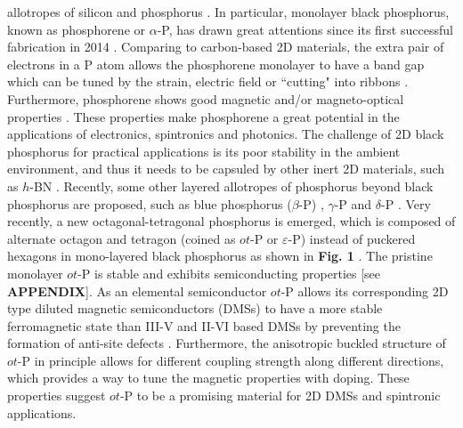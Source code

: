 \documentclass[%
superscriptaddress,
preprint,
showpacs,preprintnumbers,
 amsmath,amssymb,
prb,
]{revtex4-1}
\begin{document}
allotropes of silicon and phosphorus \cite{wang2012electronics, lopez2011boron, Reich2014Nature}. In particular, monolayer black phosphorus, known as phosphorene or $\alpha$-P, has drawn great attentions since its first successful fabrication in 2014 \cite{Li2014NN, Liu2014AN, Koenig2014APL}. Comparing to carbon-based 2D materials, the extra pair of electrons in a P atom allows the phosphorene monolayer to have a band gap which can be tuned by the strain, electric field or ``cutting" into ribbons \cite{Rodin2014PRL, Peng2014PRB, Zhu2014PRL, Zhu2015PRB, Guan2014PRB, Guan2016PRB, Fei2014NL, Fei2015PRB, Tran2014PRB, Tran2014PRB2, Ghosh2016PRB, Wu2015PRB, Gomes2015PRB, Ziletti2015PRB, Elahi2015PRB, Cakir2015PRB, Maity2016PRB, Ma2016PRB, Rivero2015PRB}. Furthermore, phosphorene shows good magnetic and/or magneto-optical properties \cite{Yang2016PRB, Seixas2015PRB, Hanakata2016PRB, Fu2015PRB, Tahir2015PRB, Jiang2015PRB, Pereira2015PRB, Ostahie2016PRB, Zhou2015PRB}. These properties make phosphorene a great potential in the applications of electronics, spintronics and photonics. The challenge of 2D black phosphorus for practical applications is its poor stability in the ambient environment, and thus it needs to be capsuled by other inert 2D materials, such as $h$-BN \cite{Koenig2014APL, Ziletti2015PRL, Ziletti2015PRB, Guan2014PRB, Rivero2015PRB}. Recently, some other layered allotropes of phosphorus beyond black phosphorus are proposed, such as blue phosphorus ($\beta$-P) \cite{Zhu2014PRL}, $\gamma$-P \cite{Guan2014PRL, Guan2014PRL2, Boulfelfel2012PRB} and $\delta$-P \cite{Guan2014PRL, Guan2014PRL2}. Very recently, a new octagonal-tetragonal phosphorus is emerged, which is composed of alternate octagon and tetragon (coined as $ot$-P or $\varepsilon$-P) instead of puckered hexagons in mono-layered black phosphorus as shown in \textbf{Fig. 1} \cite{Zhang2015CMS, Zhao2016CPL}. The pristine monolayer $ot$-P is stable and exhibits semiconducting properties [see \textbf{APPENDIX}]. As an elemental semiconductor $ot$-P allows its corresponding 2D type diluted magnetic semiconductors (DMSs) to have a more stable ferromagnetic state than III-V and II-VI based DMSs by preventing the formation of anti-site defects \cite{sato2010first, zhou2013intrinsic}. Furthermore, the anisotropic buckled structure of $ot$-P in principle allows for different coupling strength along different directions, which provides a way to tune the magnetic properties with doping. These properties suggest $ot$-P to be a promising material for 2D DMSs and spintronic applications.
\end{document}
